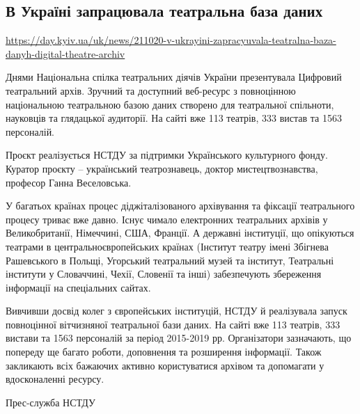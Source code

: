  
 

\subsection{В Україні запрацювала театральна база даних}
\url{https://day.kyiv.ua/uk/news/211020-v-ukrayini-zapracyuvala-teatralna-baza-danyh-digital-theatre-archiv}

Днями Національна спілка театральних діячів України презентувала Цифровий
театральний архів. Зручний та доступний веб-ресурс з повноцінною національною
театральною базою даних створено для театральної спільноти, науковців та
глядацької аудиторії. На сайті вже 113 театрів, 333 вистав та 1563 персоналій.

Проєкт реалізується НСТДУ за підтримки Українського культурного фонду. Куратор
проєкту – український театрознавець, доктор мистецтвознавства, професор Ганна
Веселовська.

У багатьох країнах процес діджіталізованого архівування та фіксації
театрального процесу триває вже давно. Існує чимало електронних театральних
архівів у Великобританії, Німеччині, США, Франції. А державні інституції, що
опікуються театрами в центральноєвропейських країнах (Інститут театру імені
Збігнева Рашевського в Польщі, Угорський театральний музей та інститут,
Театральні інститути у Словаччині, Чехії, Словенії та інші) забезпечують
збереження інформації на спеціальних сайтах.

Вивчивши досвід колег з європейських інституцій, НСТДУ й реалізувала запуск
повноцінної вітчизняної театральної бази даних. На сайті вже 113 театрів, 333
вистави та 1563 персоналій за період 2015-2019 рр. Організатори зазначають, що
попереду ще багато роботи, доповнення та розширення інформації. Також
закликають всіх бажаючих активно користуватися архівом та допомагати у
вдосконаленні ресурсу.

Прес-служба НСТДУ
